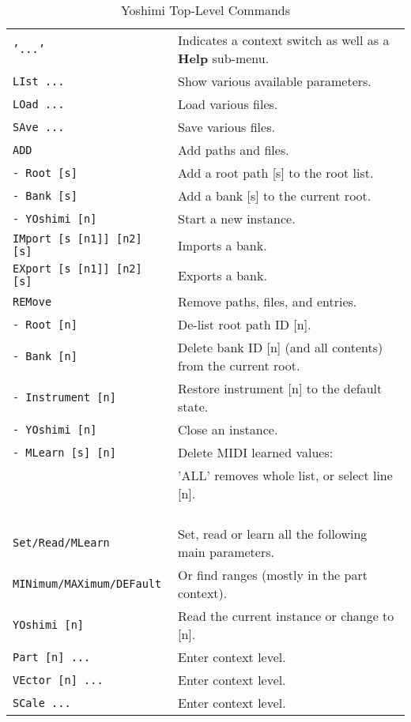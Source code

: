 \begin{center}
\begin{longtable}{p{6cm} p{10cm}}
\caption[Yoshimi Top-Level Commands]{Yoshimi Top-Level Commands} \\
\texttt{'...'} &
   Indicates a context switch as well as a \textbf{Help} sub-menu. \\
\texttt{LIst ...} &
   Show various available parameters. \\
\texttt{LOad ...} &
   Load various files. \\
\texttt{SAve ...} &
   Save various files. \\
\texttt{ADD} &
   Add paths and files. \\
\texttt{- Root [s]} &
   Add a root path [s] to the root list. \\
\texttt{- Bank [s]} &
   Add a bank [s] to the current root. \\
\texttt{- YOshimi [n]} &
   Start a new instance. \\
\texttt{IMport [s [n1]] [n2] [s]} &
   Imports a bank. \\
\texttt{EXport [s [n1]] [n2] [s]} &
   Exports a bank. \\
\texttt{REMove} &
   Remove paths, files, and entries. \\
\texttt{- Root [n]} &
   De-list root path ID [n]. \\
\texttt{- Bank [n]} &
   Delete bank ID [n] (and all contents) from the current root. \\
\texttt{- Instrument [n]} &
   Restore instrument [n] to the default state. \\
\texttt{- YOshimi [n]} &
   Close an instance. \\
\texttt{- MLearn [s] [n]} &
   Delete MIDI learned values: \\
\texttt{ } &
   'ALL' removes whole list, or select line [n]. \\
\texttt{ } & \\
\texttt{Set/Read/MLearn} &
   Set, read or learn all the following main parameters. \\
\texttt{MINimum/MAXimum/DEFault} &
   Or find ranges (mostly in the part context). \\
\texttt{YOshimi [n]} &
   Read the current instance or change to [n]. \\
\texttt{Part [n] ...} &
   Enter context level. \\
\texttt{VEctor [n] ...} &
   Enter context level. \\
\texttt{SCale ...} &
   Enter context level. \\

\end{longtable}
\end{center}
